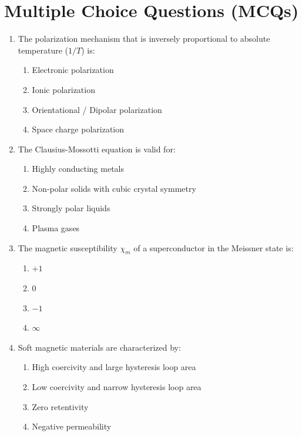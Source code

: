 \section{Multiple Choice Questions (MCQs)}

\begin{enumerate}
    \item The polarization mechanism that is inversely proportional to absolute temperature ($1/T$) is:
    \begin{enumerate}
        \item Electronic polarization
        \item Ionic polarization
        \item Orientational / Dipolar polarization
        \item Space charge polarization
    \end{enumerate}
    
    \item The Clausius-Mossotti equation is valid for:
    \begin{enumerate}
        \item Highly conducting metals
        \item Non-polar solids with cubic crystal symmetry
        \item Strongly polar liquids
        \item Plasma gases
    \end{enumerate}
    
    \item The magnetic susceptibility $\chi_m$ of a superconductor in the Meissner state is:
    \begin{enumerate}
        \item $+1$
        \item $0$
        \item $-1$
        \item $\infty$
    \end{enumerate}
    
    \item Soft magnetic materials are characterized by:
    \begin{enumerate}
        \item High coercivity and large hysteresis loop area
        \item Low coercivity and narrow hysteresis loop area
        \item Zero retentivity
        \item Negative permeability
    \end{enumerate}
    

\end{enumerate}

